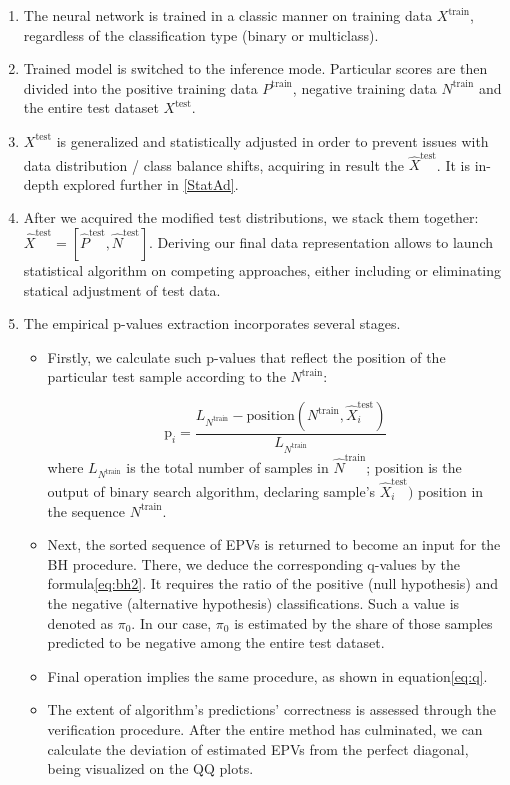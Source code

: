 \documentclass{article}
\begin{document}
\begin{enumerate}%
    \item The neural network is trained in a classic manner on training data $X^{\text{train}}$, regardless of the classification type (binary or multiclass).
    \item Trained model is switched to the inference mode. Particular scores are then divided into the positive training data $P^{\text{train}}$, negative training data $N^{\text{train}}$ and the entire test dataset $X^{\text{test}}$.
    
    \item $X^{\text{test}}$ is generalized and statistically adjusted in order to prevent issues with data distribution / class balance shifts, acquiring in result the $\hat{X}^{\text{test}}$. It is in-depth explored further in \ref{StatAd}.

    \item  After we acquired the modified test distributions, we stack them together: $\hat{X}^{\text{test}} = [\hat{P}^{\text{test}}, \hat{N}^{\text{test}}]$. Deriving our final data representation allows to launch statistical algorithm on competing approaches, either including or eliminating statical adjustment of test data.

    \item The empirical p-values extraction incorporates several stages. \begin{itemize}
        \item  Firstly, we calculate such p-values that reflect the position of the particular test sample according to the $N^{\text{train}}$:

    \begin{equation}
        \text{p}_i = \frac{L_{N^{\text{train}}} - \text{position}(N^\text{train}, \hat{X}^{\text{test}}_i)}{L_{N^{\text{train}}}}
    \end{equation}
    where $L_{N^{\text{train}}}$ is the total number of samples in $\hat{N}^{\text{train}}$; position is the output of binary search algorithm, declaring sample's $\hat{X}^{\text{test}}_i)$ position in the sequence $N^{\text{train}}$. 

    \item Next, the sorted sequence of EPVs is returned to become an input for the BH procedure. There, we deduce the corresponding q-values by the formula\ref{eq:bh2}. It requires the ratio of the positive (null hypothesis) and the negative (alternative hypothesis) classifications. Such a value is denoted as $\pi_0$. In our case, $\pi_0$ is estimated by the share of those samples predicted to be negative among the entire test dataset. 
    \item Final operation implies the same procedure, as shown in equation\ref{eq:q}.
    \item The extent of algorithm's predictions' correctness is assessed through the verification procedure. After the entire method has culminated, we can calculate the deviation of estimated EPVs from the perfect diagonal, being visualized on the QQ plots. 
    \end{itemize}
\end{enumerate}
\end{document}
